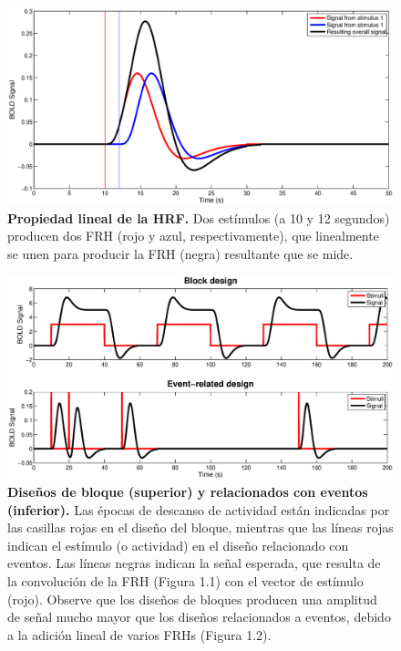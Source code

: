 \documentclass[12pt,a5,twoside]{book}
\begin{document}
\begin{figure}
	\centering
    \includegraphics [scale=0.5,center] {HRF_two.eps}
    \caption{\textbf{Propiedad lineal de la HRF.} Dos estímulos (a 10 y 12 segundos) producen dos FRH (rojo y azul, respectivamente), que linealmente se unen para producir la FRH (negra) resultante que se mide.}
    \label{F:HRF_two}
\end{figure}

\begin{figure}
	\centering
    \includegraphics [scale=0.5,center] {fMRI_designs.eps}
    \caption{\textbf{Diseños de bloque (superior) y relacionados con eventos (inferior).} Las épocas de descanso de actividad están indicadas por las casillas rojas en el diseño del bloque, mientras que las líneas rojas indican el estímulo (o actividad) en el diseño relacionado con  eventos. Las líneas negras indican la señal esperada, que resulta de la convolución de la FRH (Figura 1.1) con el vector de estímulo (rojo). Observe que los diseños de bloques producen una amplitud de señal mucho mayor que los diseños relacionados a eventos, debido a la adición lineal de varios FRHs (Figura 1.2).}
    \label{F:fMRI_designs}
\end{figure}
\end{document}
